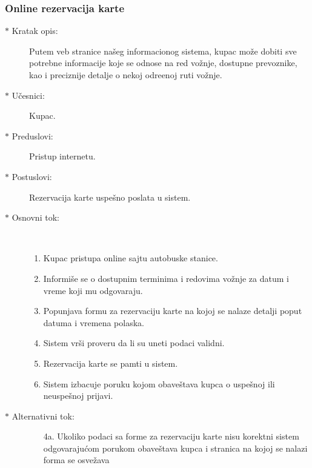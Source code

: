 \subsubsection{Online rezervacija karte}
\begin{description}
	\item [$\ast$ Kratak opis: ] Putem veb stranice na\v seg informacionog sistema, kupac mo\v ze dobiti sve potrebne informacije koje se odnose na red vo\v znje, dostupne prevoznike, kao i preciznije detalje o nekoj odre\dj{}enoj ruti vo\v znje.
	
	\item[$\ast$ U\v cesnici: ] Kupac.
	\item[$\ast$ Preduslovi: ] Pristup internetu.
	\item[$\ast$ Postuslovi: ] Rezervacija karte uspe\v sno poslata u sistem.
	\item[$\ast$ Osnovni tok: ] \ \\
	\renewcommand{\labelenumii}{\Roman{enumii}}
	\begin{enumerate}
		\item Kupac pristupa online sajtu autobuske stanice.
		\item Informi\v se se o dostupnim terminima i redovima vo\v znje za datum i vreme koji mu odgovaraju.
		\item Popunjava formu za rezervaciju karte na kojoj se nalaze detalji poput datuma i vremena polaska.
		\item Sistem vr\v si proveru da li su uneti podaci validni.
		\item Rezervacija karte se pamti u sistem.
		\item Sistem izbacuje poruku kojom obave\v stava kupca o uspe\v snoj ili neuspe\v snoj prijavi.
	\end{enumerate}
	\item[$\ast$ Alternativni tok: ]
	\begin{enumerate}
		\item[4a. ] Ukoliko podaci sa forme za rezervaciju karte nisu korektni sistem odgovaraju\'com porukom obave\v stava kupca i stranica na kojoj se nalazi forma se osve\v zava
	\end{enumerate}
	
\end{description}
\newpage
